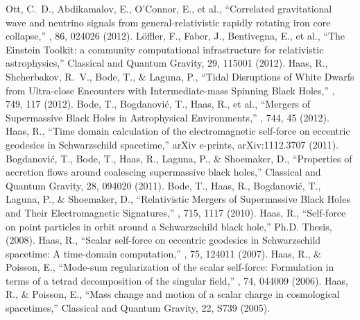  Ott, C.~D., Abdikamalov, E., O'Connor, E., et al., ``Correlated gravitational wave and neutrino signals from general-relativistic rapidly rotating iron core collapse,'' \prd, 86, 024026 (2012).
 L{\"o}ffler, F., Faber, J., Bentivegna, E., et al., ``The Einstein Toolkit: a community computational infrastructure for relativistic astrophysics,'' Classical and Quantum Gravity, 29, 115001 (2012).
 Haas, R., Shcherbakov, R.~V., Bode, T., \& Laguna, P., ``Tidal Disruptions of White Dwarfs from Ultra-close Encounters with Intermediate-mass Spinning Black Holes,'' \apj, 749, 117 (2012).
 Bode, T., Bogdanovi{\'c}, T., Haas, R., et al., ``Mergers of Supermassive Black Holes in Astrophysical Environments,'' \apj, 744, 45 (2012).
 Haas, R., ``Time domain calculation of the electromagnetic self-force on eccentric geodesics in Schwarzschild spacetime,'' arXiv e-prints, arXiv:1112.3707 (2011).
 Bogdanovi{\'c}, T., Bode, T., Haas, R., Laguna, P., \& Shoemaker, D., ``Properties of accretion flows around coalescing supermassive black holes,'' Classical and Quantum Gravity, 28, 094020 (2011).
 Bode, T., Haas, R., Bogdanovi{\'c}, T., Laguna, P., \& Shoemaker, D., ``Relativistic Mergers of Supermassive Black Holes and Their Electromagnetic Signatures,'' \apj, 715, 1117 (2010).
 Haas, R., ``Self-force on point particles in orbit around a Schwarzschild black hole,'' Ph.D. Thesis, (2008).
 Haas, R., ``Scalar self-force on eccentric geodesics in Schwarzschild spacetime: A time-domain computation,'' \prd, 75, 124011 (2007).
 Haas, R., \& Poisson, E., ``Mode-sum regularization of the scalar self-force: Formulation in terms of a tetrad decomposition of the singular field,'' \prd, 74, 044009 (2006).
 Haas, R., \& Poisson, E., ``Mass change and motion of a scalar charge in cosmological spacetimes,'' Classical and Quantum Gravity, 22, S739 (2005).
